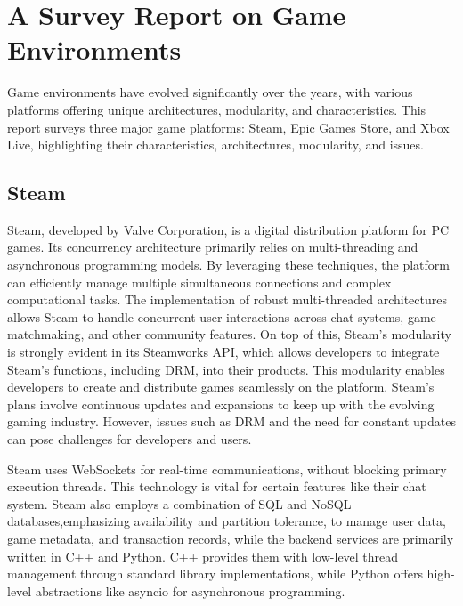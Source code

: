 \documentclass[]{interim}
\begin{document}
\chapter{A Survey Report on Game Environments}

Game environments have evolved significantly over the years, with various platforms
offering unique architectures, modularity, and characteristics. This report surveys
three major game platforms: Steam, Epic Games Store, and Xbox Live, highlighting
their characteristics, architectures, modularity, and issues.

\section{Steam}
Steam, developed by Valve Corporation, is a digital distribution platform
for PC games. Its concurrency architecture primarily relies on multi-threading and asynchronous
programming models. By leveraging these techniques, the platform can efficiently manage
multiple simultaneous connections and complex computational tasks. The implementation
of robust multi-threaded architectures allows Steam to handle concurrent user interactions
across chat systems, game matchmaking, and other community features. On top of this,
Steam's modularity is strongly evident in its Steamworks API, which allows developers to
integrate Steam's functions, including DRM, into their products.\cite{simmons_decoding_2023, noauthor_steamworks_nodate}
This modularity enables developers to create and distribute games seamlessly on the platform.
Steam's plans involve continuous updates and expansions to keep up with
the evolving gaming industry.\cite{noauthor_steam_nodate1} However, issues such as DRM and the need for
constant updates can pose challenges for developers and users\cite{noauthor_steam_nodate}.

Steam uses WebSockets for real-time communications, without blocking primary execution threads.
This technology is vital for certain features like their chat system.\cite{noauthor_isteamnetworkingsockets_nodate}
Steam also employs a combination of SQL and NoSQL databases\cite{simmons_decoding_2023, djundik_how_2017},emphasizing availability
and partition tolerance, to manage user data, game metadata, and transaction records, while
the backend services are primarily written in C++ and Python.\cite{simmons_decoding_2023}  C++ provides them with low-level thread management through standard
library implementations, while Python offers high-level abstractions like asyncio
for asynchronous programming.
\end{document}
